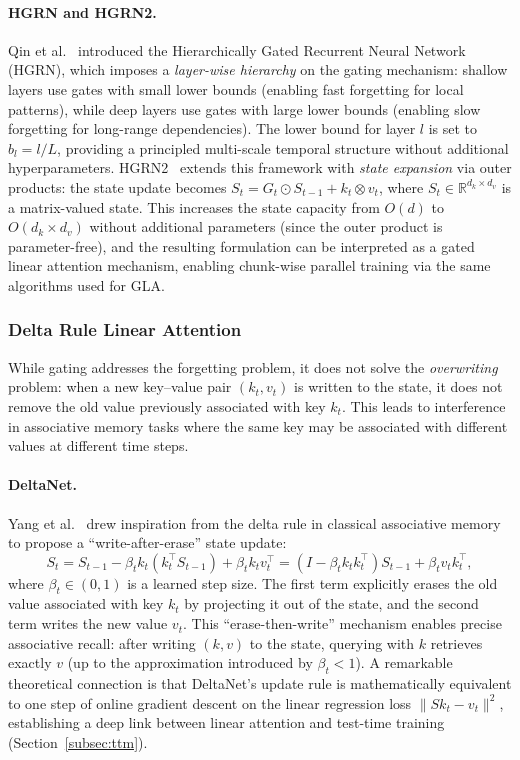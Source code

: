 \paragraph{HGRN and HGRN2.}
Qin et al.~\cite{qin2023hgrn} introduced the Hierarchically Gated Recurrent Neural Network (HGRN), which imposes a \emph{layer-wise hierarchy} on the gating mechanism: shallow layers use gates with small lower bounds (enabling fast forgetting for local patterns), while deep layers use gates with large lower bounds (enabling slow forgetting for long-range dependencies). The lower bound for layer $l$ is set to $b_l = l/L$, providing a principled multi-scale temporal structure without additional hyperparameters. HGRN2~\cite{qin2024hgrn2} extends this framework with \emph{state expansion} via outer products: the state update becomes $S_t = G_t \odot S_{t-1} + k_t \otimes v_t$, where $S_t \in \mathbb{R}^{d_k \times d_v}$ is a matrix-valued state. This increases the state capacity from $O(d)$ to $O(d_k \times d_v)$ without additional parameters (since the outer product is parameter-free), and the resulting formulation can be interpreted as a gated linear attention mechanism, enabling chunk-wise parallel training via the same algorithms used for GLA.

\subsubsection{Delta Rule Linear Attention}
\label{subsubsec:delta-linear}

While gating addresses the forgetting problem, it does not solve the \emph{overwriting} problem: when a new key--value pair $(k_t, v_t)$ is written to the state, it does not remove the old value previously associated with key $k_t$. This leads to interference in associative memory tasks where the same key may be associated with different values at different time steps.

\paragraph{DeltaNet.}
Yang et al.~\cite{yang2024deltanet} drew inspiration from the delta rule in classical associative memory to propose a ``write-after-erase'' state update:
\begin{equation}
S_t = S_{t-1} - \beta_t k_t (k_t^\top S_{t-1}) + \beta_t k_t v_t^\top = (I - \beta_t k_t k_t^\top) S_{t-1} + \beta_t v_t k_t^\top,
\label{eq:deltanet}
\end{equation}
where $\beta_t \in (0, 1)$ is a learned step size. The first term explicitly erases the old value associated with key $k_t$ by projecting it out of the state, and the second term writes the new value $v_t$. This ``erase-then-write'' mechanism enables precise associative recall: after writing $(k, v)$ to the state, querying with $k$ retrieves exactly $v$ (up to the approximation introduced by $\beta_t < 1$). A remarkable theoretical connection is that DeltaNet's update rule is mathematically equivalent to one step of online gradient descent on the linear regression loss $\|S k_t - v_t\|^2$, establishing a deep link between linear attention and test-time training (Section~\ref{subsec:ttm}).

